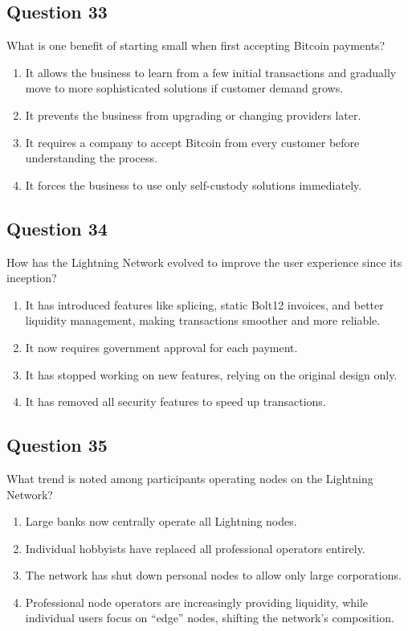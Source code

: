 \documentclass[12pt,a4paper]{article}
\begin{document}
\bigskip


\subsection*{Question 33}
What is one benefit of starting small when first accepting Bitcoin payments?

\begin{enumerate}[label=\Alph*., leftmargin=*]
\item It allows the business to learn from a few initial transactions and gradually move to more sophisticated solutions if customer demand grows.
\item It prevents the business from upgrading or changing providers later.
\item It requires a company to accept Bitcoin from every customer before understanding the process.
\item It forces the business to use only self-custody solutions immediately.
\end{enumerate}

\bigskip


\subsection*{Question 34}
How has the Lightning Network evolved to improve the user experience since its inception?

\begin{enumerate}[label=\Alph*., leftmargin=*]
\item It has introduced features like splicing, static Bolt12 invoices, and better liquidity management, making transactions smoother and more reliable.
\item It now requires government approval for each payment.
\item It has stopped working on new features, relying on the original design only.
\item It has removed all security features to speed up transactions.
\end{enumerate}

\bigskip


\subsection*{Question 35}
What trend is noted among participants operating nodes on the Lightning Network?

\begin{enumerate}[label=\Alph*., leftmargin=*]
\item Large banks now centrally operate all Lightning nodes.
\item Individual hobbyists have replaced all professional operators entirely.
\item The network has shut down personal nodes to allow only large corporations.
\item Professional node operators are increasingly providing liquidity, while individual users focus on “edge” nodes, shifting the network’s composition.
\end{enumerate}
\end{document}
